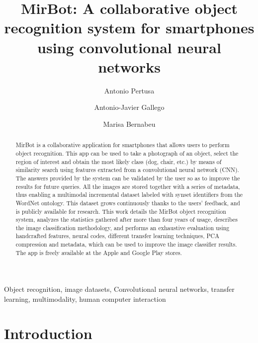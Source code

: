 \documentclass[final, twocolumn]{elsarticle}
\begin{document}
\begin{frontmatter}

\title{MirBot: A collaborative object recognition system for smartphones using convolutional neural networks}

\author{Antonio Pertusa}
\author{Antonio-Javier Gallego}
\author{Marisa Bernabeu}
\address{Dpto. Lenguajes y Sistemas Inform\'{a}ticos, Universidad de Alicante, E-03690, San Vicente del Raspeig, Alicante, Spain}



\begin{abstract}
MirBot is a collaborative application for smartphones that allows users to perform object recognition. This app can be used to take a photograph of an object, select the region of interest and obtain the most likely class (dog, chair, etc.) by means of similarity search using features extracted from a convolutional neural network (CNN). The answers provided by the system can be validated by the user so as to improve the results for future queries. All the images are stored together with a series of metadata, thus enabling a multimodal incremental dataset labeled with synset identifiers from the WordNet ontology. This dataset grows continuously thanks to the users' feedback, and is publicly available for research. This work details the MirBot object recognition system, analyzes the statistics gathered after more than four years of usage, describes the image classification methodology, and performs an exhaustive evaluation using handcrafted features, neural codes, different transfer learning techniques, PCA compression and metadata, which can be used to improve the image classifier results. %
The app is freely available at the Apple and Google Play stores.
\end{abstract}

\begin{keyword}
Object recognition, image datasets, Convolutional neural networks, transfer learning, multimodality, human computer interaction
\end{keyword}


\end{frontmatter}

\ifarxiv
\else
\linenumbers
\fi


\section{Introduction}
\end{document}

